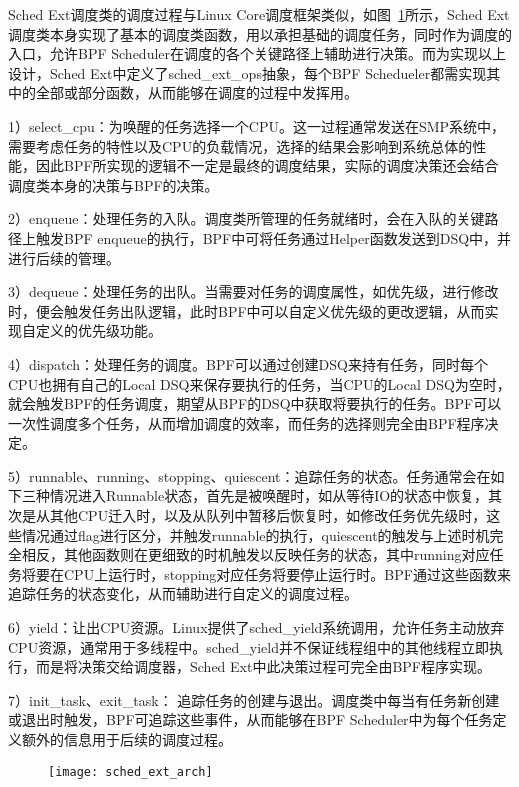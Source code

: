 Sched Ext调度类的调度过程与Linux Core调度框架类似，如图~\ref{fig:sched_ext_arch}所示，Sched Ext调度类本身实现了基本的调度类函数，用以承担基础的调度任务，同时作为调度的入口，允许BPF Scheduler在调度的各个关键路径上辅助进行决策。而为实现以上设计，Sched Ext中定义了sched\_ext\_ops抽象，每个BPF Schedueler都需实现其中的全部或部分函数，从而能够在调度的过程中发挥用。

1）select\_cpu：为唤醒的任务选择一个CPU。这一过程通常发送在SMP系统中，需要考虑任务的特性以及CPU的负载情况，选择的结果会影响到系统总体的性能，因此BPF所实现的逻辑不一定是最终的调度结果，实际的调度决策还会结合调度类本身的决策与BPF的决策。

2）enqueue：处理任务的入队。调度类所管理的任务就绪时，会在入队的关键路径上触发BPF enqueue的执行，BPF中可将任务通过Helper函数发送到DSQ中，并进行后续的管理。

3）dequeue：处理任务的出队。当需要对任务的调度属性，如优先级，进行修改时，便会触发任务出队逻辑，此时BPF中可以自定义优先级的更改逻辑，从而实现自定义的优先级功能。

4）dispatch：处理任务的调度。BPF可以通过创建DSQ来持有任务，同时每个CPU也拥有自己的Local DSQ来保存要执行的任务，当CPU的Local DSQ为空时，就会触发BPF的任务调度，期望从BPF的DSQ中获取将要执行的任务。BPF可以一次性调度多个任务，从而增加调度的效率，而任务的选择则完全由BPF程序决定。

5）runnable、running、stopping、quiescent：追踪任务的状态。任务通常会在如下三种情况进入Runnable状态，首先是被唤醒时，如从等待IO的状态中恢复，其次是从其他CPU迁入时，以及从队列中暂移后恢复时，如修改任务优先级时，这些情况通过flag进行区分，并触发runnable的执行，quiescent的触发与上述时机完全相反，其他函数则在更细致的时机触发以反映任务的状态，其中running对应任务将要在CPU上运行时，stopping对应任务将要停止运行时。BPF通过这些函数来追踪任务的状态变化，从而辅助进行自定义的调度过程。

6）yield：让出CPU资源。Linux提供了sched\_yield系统调用，允许任务主动放弃CPU资源，通常用于多线程中。sched\_yield并不保证线程组中的其他线程立即执行，而是将决策交给调度器，Sched Ext中此决策过程可完全由BPF程序实现。

7）init\_task、exit\_task： 追踪任务的创建与退出。调度类中每当有任务新创建或退出时触发，BPF可追踪这些事件，从而能够在BPF Scheduler中为每个任务定义额外的信息用于后续的调度过程。

\begin{figure}[!htbp]
    \centering
    \texttt{[image: sched\_ext\_arch]}
    \label{fig:sched_ext_arch}
\end{figure}

